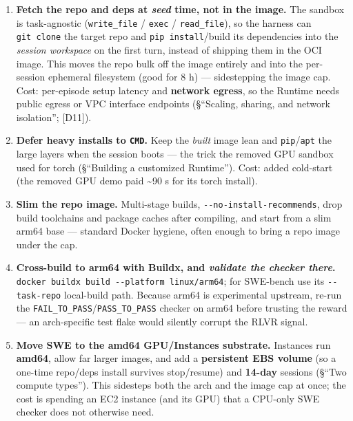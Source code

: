 \documentclass[
  paper=a4,
  ,captions=tableheading
]{scrartcl}
\providecommand{\tightlist}{%
  \setlength{\itemsep}{0pt}\setlength{\parskip}{0pt}}
\begin{document}
\begin{enumerate}
\def\labelenumi{\arabic{enumi}.}
\tightlist
\item
  \textbf{Fetch the repo and deps at \emph{seed} time, not in the
  image.} The sandbox is task-agnostic (\texttt{write\_file} /
  \texttt{exec} / \texttt{read\_file}), so the harness can
  \texttt{git\ clone} the target repo and \texttt{pip\ install}/build
  its dependencies into the \emph{session workspace} on the first turn,
  instead of shipping them in the OCI image. This moves the repo bulk
  off the image entirely and into the per-session ephemeral filesystem
  (good for 8 h) --- sidestepping the image cap. Cost: per-episode setup
  latency and \textbf{network egress}, so the Runtime needs public
  egress or VPC interface endpoints (§``Scaling, sharing, and network
  isolation''; {[}D11{]}).
\item
  \textbf{Defer heavy installs to \texttt{CMD}.} Keep the \emph{built}
  image lean and \texttt{pip}/\texttt{apt} the large layers when the
  session boots --- the trick the removed GPU sandbox used for torch
  (§``Building a customized Runtime''). Cost: added cold-start (the
  removed GPU demo paid \textasciitilde90 s for its torch install).
\item
  \textbf{Slim the repo image.} Multi-stage builds,
  \texttt{-\/-no-install-recommends}, drop build toolchains and package
  caches after compiling, and start from a slim arm64 base --- standard
  Docker hygiene, often enough to bring a repo image under the cap.
\item
  \textbf{Cross-build to arm64 with Buildx, and \emph{validate the
  checker there}.}
  \texttt{docker\ buildx\ build\ -\/-platform\ linux/arm64}; for
  SWE-bench use its \texttt{-\/-task-repo} local-build path. Because
  arm64 is experimental upstream, re-run the
  \texttt{FAIL\_TO\_PASS}/\texttt{PASS\_TO\_PASS} checker on arm64
  before trusting the reward --- an arch-specific test flake would
  silently corrupt the RLVR signal.
\item
  \textbf{Move SWE to the amd64 GPU/Instances substrate.} Instances run
  \textbf{amd64}, allow far larger images, and add a \textbf{persistent
  EBS volume} (so a one-time repo/deps install survives stop/resume) and
  \textbf{14-day} sessions (§``Two compute types''). This sidesteps both
  the arch and the image cap at once; the cost is spending an EC2
  instance (and its GPU) that a CPU-only SWE checker does not otherwise
  need.
\end{enumerate}
\end{document}
